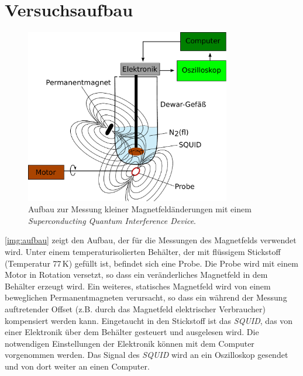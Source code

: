 \section{Versuchsaufbau}

\begin{figure}[H]
\begin{center}
  \includegraphics[width=0.8\textwidth]{../img/aufbau.pdf}
  \caption{Aufbau zur Messung kleiner Magnetfeldänderungen mit einem
  \emph{Superconducting Quantum Interference Device}.}
  \label{img:aufbau}
\end{center}
\end{figure}

\autoref{img:aufbau} zeigt den Aufbau, der für die Messungen des Magnetfelds verwendet wird.
Unter einem temperaturisolierten Behälter, der mit flüssigem Stickstoff (Temperatur 77\,K) gefüllt ist,
befindet sich eine Probe.
Die Probe wird mit einem Motor in Rotation versetzt,
so dass ein veränderliches Magnetfeld in dem Behälter erzeugt wird.
Ein weiteres, statisches Magnetfeld wird von einem beweglichen Permanentmagneten verursacht,
so dass ein während der Messung auftretender Offset (z.B. durch das Magnetfeld elektrischer Verbraucher)
kompensiert werden kann.
Eingetaucht in den Stickstoff ist das \emph{SQUID},
das von einer Elektronik über dem Behälter gesteuert und ausgelesen wird.
Die notwendigen Einstellungen der Elektronik können mit dem Computer vorgenommen werden.
Das Signal des \emph{SQUID} wird an ein Oszilloskop gesendet und
von dort weiter an einen Computer.

